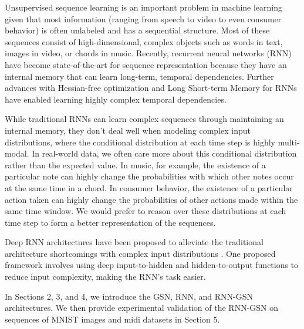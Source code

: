 Unsupervised sequence learning is an important problem in machine learning given that most information (ranging from speech to video to even consumer behavior) is often unlabeled and has a sequential structure. Most of these sequences consist of high-dimensional, complex objects such as words in text, images in video, or chords in music. Recently, recurrent neural networks (RNN) \cite{rnn} have become state-of-the-art for sequence representation because they have an internal memory that can learn long-term, temporal dependencies. Further advances with Hessian-free optimization and Long Short-term Memory for RNNs \cite{hessian_free, lstm} have enabled learning highly complex temporal dependencies.

While traditional RNNs can learn complex sequences through maintaining an internal memory, they don't deal well when modeling complex input distributions, where the conditional distribution at each time step is highly multi-modal. In real-world data, we often care more about this conditional distribution rather than the expected value. In music, for example, the existence of a particular note can highly change the probabilities with which other notes occur at the same time in a chord. In consumer behavior, the existence of a particular action taken can highly change the probabilities of other actions made within the same time window. We would prefer to reason over these distributions at each time step to form a better representation of the sequences.

Deep RNN architectures have been proposed to alleviate the traditional architecture shortcomings with complex input distributions \cite{deep_rnn}. One proposed framework involves using deep input-to-hidden and hidden-to-output functions to reduce input complexity, making the RNN's task easier.

\cite{rnnrbm}

In Sections 2, 3, and 4, we introduce the GSN, RNN, and RNN-GSN architectures. We then provide experimental validation of the RNN-GSN on sequences of MNIST images and midi datasets in Section 5.